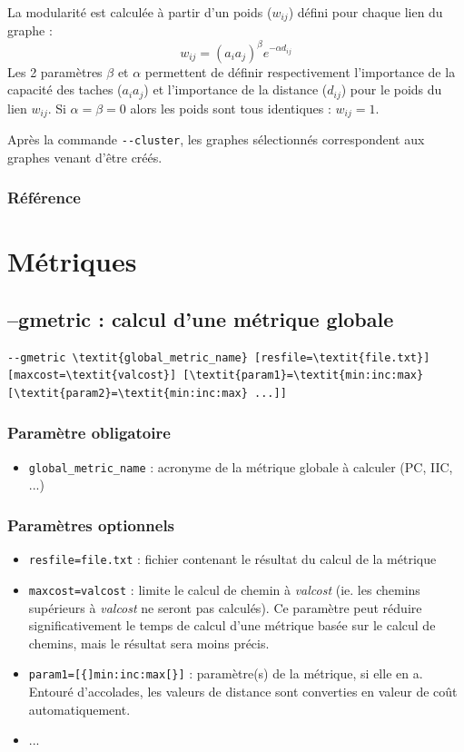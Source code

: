 \documentclass[a4paper,10pt]{report}
\begin{document}
La modularité est calculée à partir d'un poids ($w_{ij}$) défini pour chaque lien du graphe :
$$w_{ij} = (a_i a_j)^\beta e^{-\alpha d_{ij}}$$
Les 2 paramètres $\beta$ et $\alpha$ permettent de définir respectivement l'importance de la capacité des taches ($a_i a_j$) et l'importance de la distance ($d_{ij}$) pour le poids du lien $w_{ij}$. Si $\alpha = \beta = 0$ alors les poids sont tous identiques : $w_{ij} = 1$.

Après la commande \verb|--cluster|, les graphes sélectionnés correspondent aux graphes venant d'être créés.

\subsubsection{Référence}
\cite{2017_clustering}


\section{Métriques}

\subsection{--gmetric : calcul d'une métrique globale}
\begin{Verbatim}[commandchars=\\\{\}]
--gmetric \textit{global_metric_name} [resfile=\textit{file.txt}] [maxcost=\textit{valcost}] [\textit{param1}=\textit{min:inc:max} [\textit{param2}=\textit{min:inc:max} ...]]
\end{Verbatim}

\subsubsection{Paramètre obligatoire}
\begin{itemize}
	\item \verb|global_metric_name| : acronyme de la métrique globale à calculer (PC, IIC, ...)
\end{itemize}

\subsubsection{Paramètres optionnels}
\begin{itemize}
	\item \verb|resfile=file.txt| : fichier contenant le résultat du calcul de la métrique
	\item \verb|maxcost=valcost| : limite le calcul de chemin à \textit{valcost} (ie. les chemins supérieurs à \textit{valcost} ne seront pas calculés). Ce paramètre peut réduire significativement le temps de calcul d'une métrique basée sur le calcul de chemins, mais le résultat sera moins précis.
	\item \verb|param1=[{]min:inc:max[}]| : paramètre(s) de la métrique, si elle en a. Entouré d'accolades, les valeurs de distance sont converties en valeur de coût automatiquement.
	\item ...
\end{itemize}
\end{document}
